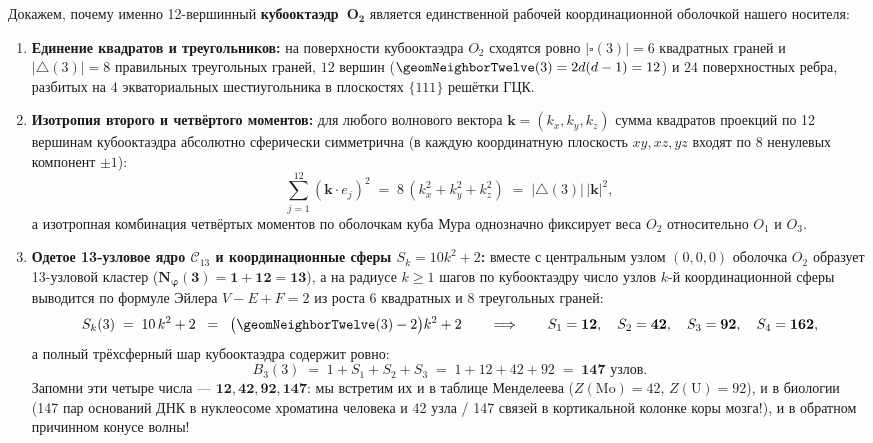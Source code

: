 Докажем, почему именно 12-вершинный \textbf{кубооктаэдр~$\mathbf{O_2}$} является единственной рабочей координационной оболочкой нашего носителя:
\begin{enumerate}[label=\textbf{(\alph*)},noitemsep]
\item \textbf{Единение квадратов и треугольников:} на поверхности кубооктаэдра $O_2$ сходятся ровно $|\square(3)| = 6$ квадратных граней и $|{\triangle}(3)| = 8$ правильных треугольных граней, $12$ вершин ($\geomNeighborTwelve(3) = 2d(d-1) = 12$) и $24$ поверхностных ребра, разбитых на $4$ экваториальных шестиугольника в плоскостях $\{111\}$ решётки ГЦК.
\item \textbf{Изотропия второго и четвёртого моментов:} для любого волнового вектора $\mathbf{k}=(k_x,k_y,k_z)$ сумма квадратов проекций по 12 вершинам кубооктаэдра абсолютно сферически симметрична (в каждую координатную плоскость $xy, xz, yz$ входят по 8 ненулевых компонент $\pm 1$):
  \[
    \sum_{j=1}^{12} (\mathbf{k}\cdot e_j)^2 \;=\; 8\,(k_x^2 + k_y^2 + k_z^2) \;=\; |{\triangle}(3)|\,|\mathbf{k}|^2,
  \]
  а изотропная комбинация четвёртых моментов по оболочкам куба Мура однозначно фиксирует веса $O_2$ относительно $O_1$ и $O_3$.
\item \textbf{Одетое 13-узловое ядро $\mathcal{C}_{13}$ и координационные сферы $S_k = 10k^2 + 2$:}
  вместе с центральным узлом $(0,0,0)$ оболочка $O_2$ образует 13-узловой кластер ($\mathbf{N_\varphi(3) = 1 + 12 = 13}$), а на радиусе $k \ge 1$ шагов по кубооктаэдру число узлов $k$-й координационной сферы выводится по формуле Эйлера $V - E + F = 2$ из роста $6$ квадратных и $8$ треугольных граней:
  \begin{equation}
    \label{eq:course-shells}
    S_k(3) \;=\; 10\,k^2 + 2 \;\;=\;\; \bigl(\geomNeighborTwelve(3) - 2\bigr)k^2 + 2
    \qquad\Longrightarrow\qquad
    S_1 = \mathbf{12},\quad S_2 = \mathbf{42},\quad S_3 = \mathbf{92},\quad S_4 = \mathbf{162},
  \end{equation}
  а полный трёхсферный шар кубооктаэдра содержит ровно:
  \begin{equation}
    \label{eq:course-ball-147}
    B_3(3) \;=\; 1 + S_1 + S_2 + S_3 \;=\; 1 + 12 + 42 + 92 \;=\; \mathbf{147\text{ узлов}}.
  \end{equation}
  Запомни эти четыре числа --- $\mathbf{12, 42, 92, 147}$: мы встретим их и в таблице Менделеева ($Z(\mathrm{Mo})=42$, $Z(\mathrm{U})=92$), и в биологии (147 пар оснований ДНК в нуклеосоме хроматина человека и 42 узла / 147 связей в кортикальной колонке коры мозга!), и в обратном причинном конусе волны!

\end{enumerate}

